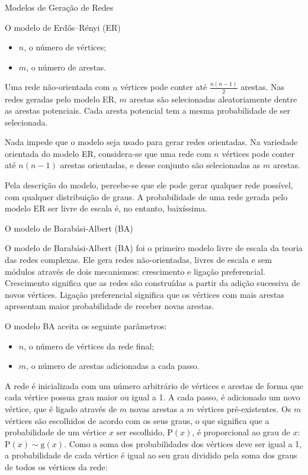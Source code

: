 \begin{section}{Modelos de Geração de Redes}
\begin{subsection}{O modelo de Erdős–Rényi (ER)}
	\begin{itemize}
		\item $n$, o número de vértices;
		\item $m$, o número de arestas.
	\end{itemize}
	
	Uma rede não-orientada com $n$ vértices pode conter até $\frac{n(n-1)}{2}$ arestas. Nas redes geradas pelo modelo ER, $m$ arestas são selecionadas aleatoriamente dentre as arestas potenciais. Cada aresta potencial tem a mesma probabilidade de ser selecionada.
	
	Nada impede que o modelo seja usado para gerar redes orientadas. Na variedade orientada do modelo ER, considera-se que uma rede com $n$ vértices pode conter até $n(n-1)$ arestas orientadas, e desse conjunto são selecionadas as $m$ arestas.
	
	Pela descrição do modelo, percebe-se que ele pode gerar qualquer rede possível, com qualquer distribuição de graus. A probabilidade de uma rede gerada pelo modelo ER ser livre de escala é, no entanto, baixíssima.

\end{subsection}

\begin{subsection}{O modelo de Barabási-Albert (BA)}	
	
	O modelo de Barabási-Albert (BA) \cite{Barabasi1999} foi o primeiro modelo livre de escala da teoria das redes complexas. Ele gera redes não-orientadas, livres de escala e sem módulos através de dois mecanismos: crescimento e ligação preferencial. Crescimento significa que as redes são construídas a partir da adição sucessiva de novos vértices. Ligação preferencial significa que os vértices com mais arestas apresentam maior probabilidade de receber novas arestas.
	
	O modelo BA aceita os seguinte parâmetros:
	
	\begin{itemize}
		\item $n$, o número de vértices da rede final;
		\item $m$, o número de arestas adicionadas a cada passo.
	\end{itemize}
	
	A rede é inicializada com um número arbitrário de vértices e arestas de forma que cada vértice possua grau maior ou igual a 1. A cada passo, é adicionado um novo vértice, que é ligado através de $m$ novas arestas a $m$ vértices pré-existentes. Os $m$ vértices são escolhidos de acordo com os seus graus, o que significa que a probabilidade de um vértice $x$ ser escolhido, $\mathrm{P}(x)$, é proporcional ao grau de $x$: $\mathrm{P}(x) \sim \mathrm{g}(x)$. Como a soma dos probabilidades dos vértices deve ser igual a 1, a probabilidade de cada vértice é igual ao seu grau dividido pela soma dos graus de todos os vértices da rede:
	

\end{subsection}
\end{section}
